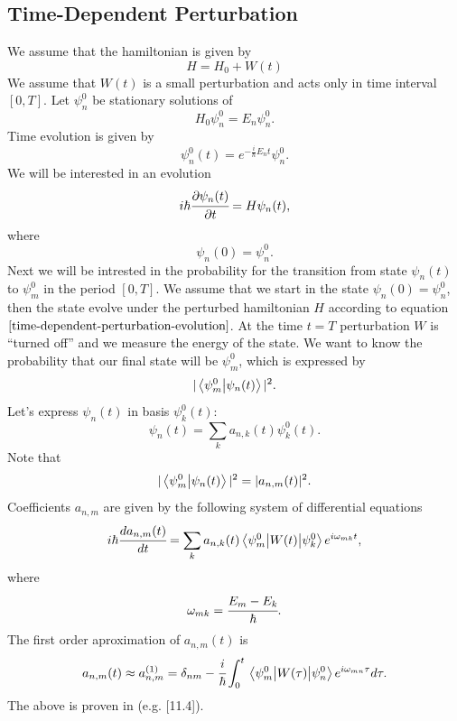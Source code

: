 \documentclass[main.tex]{subfiles}
\begin{document}
\subsection{Time-Dependent Perturbation}
We assume that the hamiltonian is given by
\begin{equation}
H = H_0 + W(t)
\end{equation}
We assume that $W(t)$ is a small perturbation and acts only in time interval $[0, T]$.
Let $\psi^0_n$ be stationary solutions of
\begin{equation}
H_0 \psi^0_n = E_n \psi^0_n.
\end{equation}
Time evolution is given by
\begin{equation}
\psi^0_n(t) = e^{-\frac{i}{\hbar}E_n t}\psi^0_n.
\end{equation}
We will be interested in an evolution
\begin{equation}
\label{time-dependent-perturbation-evolution}
i\hbar\cfrac{\partial \psi_n(t)}{\partial t} = H\psi_n(t),
\end{equation}
where
\begin{equation}
\psi_n(0) = \psi^0_n.
\end{equation}
Next we will be intrested in the probability for the transition from state $\psi_n(t)$ to $\psi^0_m$ in the period $[0,T]$.
We assume that we start in the state $\psi_n(0) = \psi^0_n$, then the state evolve under the perturbed hamiltonian $H$ according to equation $\ref{time-dependent-perturbation-evolution}$. At the time $t=T$ perturbation $W$ is ``turned off'' and we measure the energy of the state. We want to know the probability that our final state will be $\psi^0_m$, which is expressed by
\begin{equation}
|\braket{\psi^0_m}{\psi_n(t)}|^2.
\end{equation}
Let's express $\psi_n(t)$ in basis $\psi^0_k(t)$:
\begin{equation}
\psi_n(t) = \sum_k a_{n,k}(t) \psi^0_k(t).
\end{equation}
Note that
\begin{equation}
|\braket{\psi^0_m}{\psi_n(t)}|^2 = |a_{n,m}(t)|^2.
\end{equation}
Coefficients $a_{n,m}$ are given by the following system of differential equations
\begin{equation}
i\hbar \cfrac{d a_{n,m}(t)}{dt} = \sum_{k} a_{n,k}(t) \mel{\psi^0_m}{W(t)}{ \psi^0_k} e^{i\omega_{mk}t},
\end{equation}   
where
\begin{equation}
\omega_{mk} = \cfrac{E_m - E_k}{\hbar}.
\end{equation}
The first order aproximation of $a_{n,m}(t)$ is
\begin{equation}
a_{n,m}(t) \approx a^{(1)}_{n,m} = \delta_{nm} - \cfrac{i}{\hbar}\int_0^t \mel{\psi^0_m}{W(\tau)}{ \psi^0_n} e^{i\omega_{mn}\tau}d\tau.
\end{equation}
The above is proven in (e.g. \cite{walter-greiner2001}[11.4]).
\end{document}
